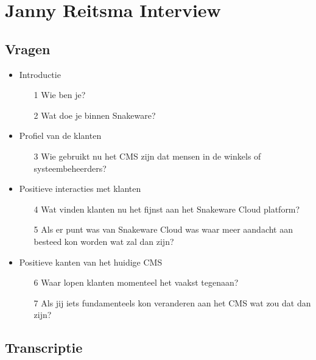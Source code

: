 \section{Janny Reitsma Interview}

\subsection*{Vragen}
\begin{itemize}
    \item{Introductie}
    \begin{itemize}
        \item[1]{Wie ben je?}
        \item[2]{Wat doe je binnen Snakeware?}
    \end{itemize}
    \item{Profiel van de klanten}
    \begin{itemize}
        \item[3]{Wie gebruikt nu het CMS zijn dat mensen in de winkels of systeembeheerders?}
    \end{itemize}\item{Positieve interacties met klanten}
    \begin{itemize}
        \item[4]{Wat vinden klanten nu het fijnst aan het Snakeware Cloud platform?}
        \item[5]{Als er punt was van Snakeware Cloud was waar meer aandacht aan besteed kon worden wat zal dan zijn?}
    \end{itemize}\item{Positieve kanten van het huidige CMS}
    \begin{itemize}
        \item[6]{Waar lopen klanten momenteel het vaakst tegenaan?}
        \item[7]{Als jij iets fundamenteels kon veranderen aan het CMS wat zou dat dan zijn?}
    \end{itemize}
\end{itemize}


\subsection*{Transcriptie}



